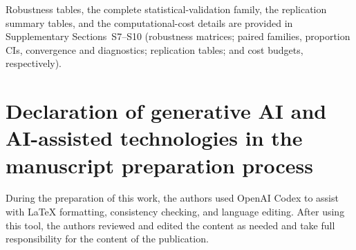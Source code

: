 \documentclass[a4paper,fleqn,doubleblind]{cas-sc}
\begin{document}
Robustness tables, the complete statistical-validation family, the replication summary tables, and the computational-cost details are provided in Supplementary Sections~S7--S10 (robustness matrices; paired families, proportion CIs, convergence and diagnostics; replication tables; and cost budgets, respectively).

\section*{Declaration of generative AI and AI-assisted technologies in the manuscript preparation process}
During the preparation of this work, the authors used OpenAI Codex to assist with LaTeX formatting, consistency checking, and language editing. After using this tool, the authors reviewed and edited the content as needed and take full responsibility for the content of the publication.

\setlength{\bibsep}{2.5pt plus 0.5pt minus 0.5pt}


\end{document}
